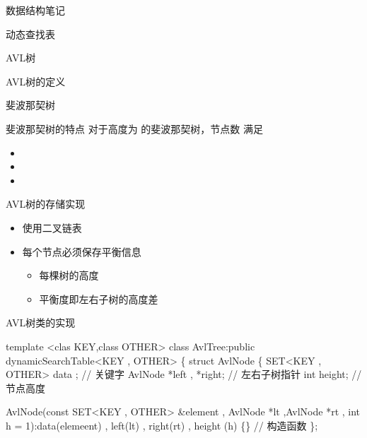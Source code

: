 \documentclass[
  ignorenonframetext,
]{beamer}
\newenvironment{Shaded}{}{}
\newcommand{\NormalTok}[1]{#1}
\providecommand{\tightlist}{%
  \setlength{\itemsep}{0pt}\setlength{\parskip}{0pt}}
\begin{document}
\begin{frame}[fragile]{数据结构笔记}
\begin{block}{动态查找表}
\begin{block}{AVL树}
\begin{block}{AVL树的定义}
\begin{block}{斐波那契树}
\begin{block}{斐波那契树的特点}
\protect{}\label{ux6590ux6ce2ux90a3ux5951ux6811ux7684ux7279ux70b9}
对于高度为 {} 的斐波那契树，节点数 {} 满足

\begin{itemize}
\tightlist
\item
  {}
\item
  {}
\item
  {}
\end{itemize}
\end{block}
\end{block}
\end{block}

\begin{block}{AVL树的存储实现}
\protect{}\label{avlux6811ux7684ux5b58ux50a8ux5b9eux73b0}
\begin{itemize}
\tightlist
\item
  使用二叉链表
\item
  每个节点必须保存平衡信息

  \begin{itemize}
  \tightlist
  \item
    每棵树的高度
  \item
    平衡度即左右子树的高度差
  \end{itemize}
\end{itemize}

\begin{block}{AVL树类的实现}
\protect{}\label{avlux6811ux7c7bux7684ux5b9eux73b0}
\begin{Shaded}
\begin{Highlighting}[]
\NormalTok{template \textless{}clas KEY,class OTHER\textgreater{}}
\NormalTok{class AvlTree:public dynamicSearchTable\textless{}KEY , OTHER\textgreater{}}
\NormalTok{\{}
\NormalTok{    struct AvlNode}
\NormalTok{    \{}
\NormalTok{      SET\textless{}KEY , OTHER\textgreater{} data ; // 关键字}
\NormalTok{      AvlNode *left , *right; // 左右子树指针}
\NormalTok{      int height;            // 节点高度}
  
\NormalTok{      AvlNode(const SET\textless{}KEY , OTHER\textgreater{} \&element , AvlNode *lt ,AvlNode   *rt , int h = 1):data(elemeent) , left(lt) , right(rt) , height  (h) \{\} // 构造函数}
\NormalTok{    \};}
  

\end{Highlighting}
\end{Shaded}
\end{block}
\end{block}
\end{block}
\end{block}
\end{frame}
\end{document}
